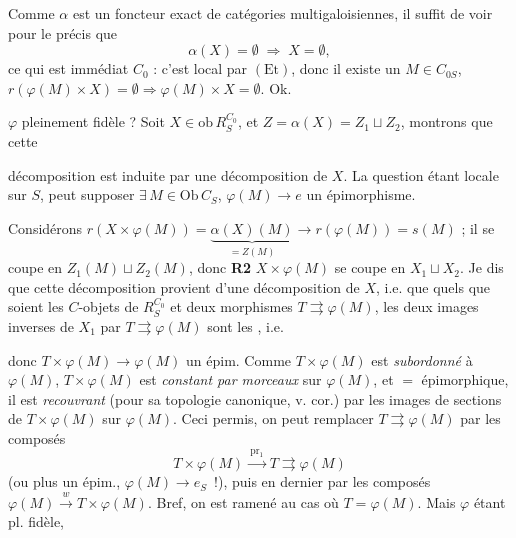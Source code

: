 \documentclass[11pt,a4paper]{article}
\begin{document}
Comme $\alpha$ est \ill{} un foncteur exact de catégories multigaloisiennes,
il suffit de voir pour le  précis que
\[
  \alpha(X) = \emptyset \;\Longrightarrow\; X = \emptyset ,
\]
ce qui est immédiat \ill{} $C_0$   : c'est
local par $(\mathrm{Et})$, 
donc \ill{} il existe un $M \in C_{0S}$, \ill{}
$r(\varphi(M) \times X) = \emptyset \Longrightarrow \varphi(M) \times X =
\emptyset$. Ok.

$\varphi$ pleinement fidèle ? Soit $X \in \mathrm{ob}\,R_S^{C_0}$, et
$Z = \alpha(X) = Z_1 \sqcup Z_2$, montrons que cette




décomposition est induite par une décomposition de $X$. La question étant
locale sur $S$, \ill{} peut supposer $\exists\, M \in \mathrm{Ob}\,C_S$,
$\varphi(M) \longrightarrow e$ un épimorphisme.

Considérons $r(X \times \varphi(M)) = \underbrace{\alpha(X)(M)}_{= Z(M)}
\longrightarrow r(\varphi(M)) = s(M)$ ; il se coupe en
$Z_1(M) \sqcup Z_2(M)$, donc  \textbf{R2}
$X \times \varphi(M)$ se coupe en $X_1 \sqcup X_2$. Je dis que
\struck{\ill{}} cette décomposition provient d'une décomposition de $X$, i.e.
que quels que soient les $C$-objets   de $R_S^{C_0}$ et
deux morphismes $T \rightrightarrows \varphi(M)$, les deux images inverses de
$X_1$ par $T \rightrightarrows \varphi(M)$ sont les \ill{}, i.e.
\struck{\ill{}}


donc $T \times \varphi(M) \longrightarrow \varphi(M)$ un épim. Comme
$T \times \varphi(M)$ est \emph{subordonné} à $\varphi(M)$,
$T \times \varphi(M)$ est \emph{constant par morceaux} sur $\varphi(M)$, et
\ill{} $=$ épimorphique, il est \emph{recouvrant} (pour sa topologie
canonique, v. cor.) par les images de sections  de
$T \times \varphi(M)$ sur $\varphi(M)$. Ceci permis, on peut remplacer
$T \rightrightarrows \varphi(M)$ par les composés
\[
  T \times \varphi(M) \xrightarrow{\ \mathrm{pr}_1\ } T
  \rightrightarrows \varphi(M)
\]
(ou plus un épim., $\varphi(M) \longrightarrow e_S$ \,!), puis en
dernier par les composés
$\varphi(M) \xrightarrow{\ w\ } T \times \varphi(M)$. Bref, on est ramené au
cas où $T = \varphi(M)$. Mais $\varphi$ étant pl. fidèle,
\end{document}
